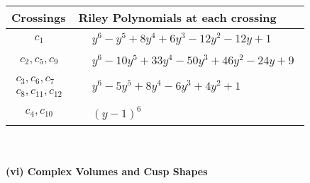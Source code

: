 \documentclass[1p]{elsarticle_modified}
\theoremstyle{definition}
\begin{document}
\begin{tabular}{m{50pt}|m{274pt}}
Crossings & \hspace{64pt}Riley Polynomials at each crossing \\
\hline $$\begin{aligned}c_{1}\end{aligned}$$&$\begin{aligned}
&y^6- y^5+8 y^4+6 y^3-12 y^2-12 y+1
\end{aligned}$\\
\hline $$\begin{aligned}c_{2},c_{5},c_{9}\end{aligned}$$&$\begin{aligned}
&y^6-10 y^5+33 y^4-50 y^3+46 y^2-24 y+9
\end{aligned}$\\
\hline $$\begin{aligned}c_{3},c_{6},c_{7}\\c_{8},c_{11},c_{12}\end{aligned}$$&$\begin{aligned}
&y^6-5 y^5+8 y^4-6 y^3+4 y^2+1
\end{aligned}$\\
\hline $$\begin{aligned}c_{4},c_{10}\end{aligned}$$&$\begin{aligned}
&(y-1)^6
\end{aligned}$\\
\hline
\end{tabular}\\~\\
\newpage\flushleft \textbf{(vi) Complex Volumes and Cusp Shapes}
\end{document}

